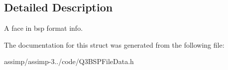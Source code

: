 \subsection{Detailed Description}
A face in bsp format info. 

The documentation for this struct was generated from the following file\+:\begin{DoxyCompactItemize}
\item 
assimp/assimp-\/3../code/Q3\+B\+S\+P\+File\+Data.\+h\end{DoxyCompactItemize}
